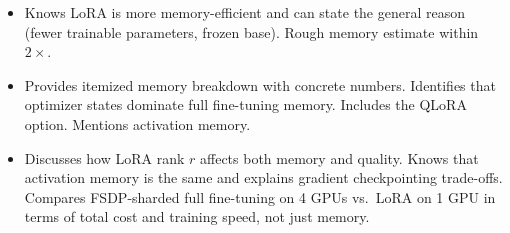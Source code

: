 \begin{interviewq}
\goodgreat
\begin{itemize}
    \item {} Knows LoRA is more memory-efficient and can state the general reason (fewer trainable parameters, frozen base). Rough memory estimate within $2\times$.
    \item {} Provides itemized memory breakdown with concrete numbers. Identifies that optimizer states dominate full fine-tuning memory. Includes the QLoRA option. Mentions activation memory.
    \item {} Discusses how LoRA rank $r$ affects both memory and quality. Knows that activation memory is the same and explains gradient checkpointing trade-offs. Compares FSDP-sharded full fine-tuning on 4 GPUs vs.\ LoRA on 1 GPU in terms of total cost and training speed, not just memory.
\end{itemize}

\end{interviewq}

